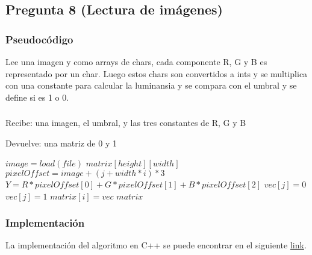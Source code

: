 \subsection*{Pregunta 8 (Lectura de imágenes)}
\subsubsection*{Pseudocódigo}
Lee una imagen y como arrays de chars, cada componente R, G y B es representado por un char. Luego estos chars son convertidos a ints y se multiplica con una constante para calcular la luminansia y se compara con el umbral y se define si es 1 o 0.

\subsubsection*{}
Recibe: una imagen, el umbral, y las tres constantes de R, G y B

Devuelve: una matriz de 0 y 1
\begin{algorithmic}[1]
  \STATE $image = load(file)$
  \STATE $matrix[height][width]$
        \STATE $pixelOffset = image + (j + width * i) * 3$
        \STATE $Y = R*pixelOffset[0] + G*pixelOffset[1] + B*pixelOffset[2]$
            \STATE $vec[j] = 0$
        \ELSE 
            \STATE $vec[j] = 1$
        \ENDIF
    \ENDFOR
    \STATE $matrix[i] = vec$
  \ENDFOR
  \RETURN $matrix$
   
\end{algorithmic}
\subsubsection*{Implementación}
La implementación del algoritmo en C++ se puede encontrar en el siguiente \href{https://github.com/Guillermo598/ProyectoADA/blob/master/Pregunta8.cpp}{link}.